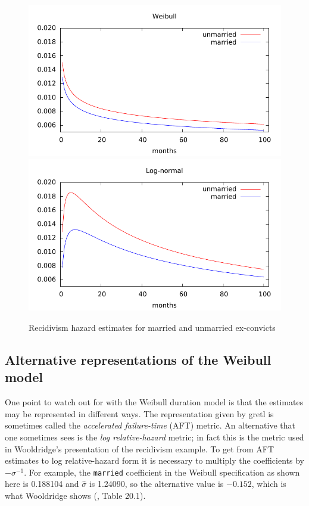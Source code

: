 \begin{figure}[htbp]
\centering
\includegraphics[scale=0.85]{figures/weibull}
\includegraphics[scale=0.85]{figures/lognorm}
\caption{Recidivism hazard estimates for married and unmarried
  ex-convicts}
\label{fig:hazard-plots}
\end{figure}

\subsection{Alternative representations of the Weibull model}

One point to watch out for with the Weibull duration model is that the
estimates may be represented in different ways.  The representation
given by gretl is sometimes called the \textit{accelerated
  failure-time} (AFT) metric. An alternative that one sometimes sees
is the \textit{log relative-hazard} metric; in fact this is the metric
used in Wooldridge's presentation of the recidivism example.  To get
from AFT estimates to log relative-hazard form it is necessary to
multiply the coefficients by $-\sigma^{-1}$. For example, the
\texttt{married} coefficient in the Weibull specification as shown
here is 0.188104 and $\hat{\sigma}$ is 1.24090, so the alternative
value is $-0.152$, which is what Wooldridge shows
(\citeyear{wooldridge-panel}, Table 20.1).

